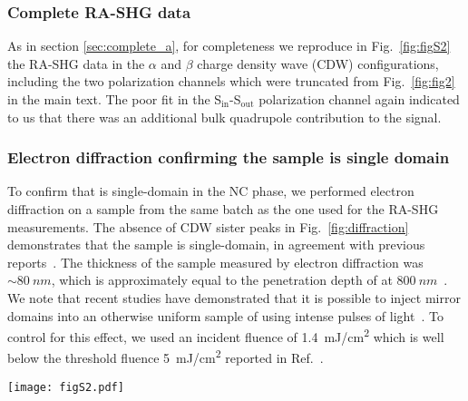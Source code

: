 \subsubsection{Complete RA-SHG data\label{sec:complete_b}}
As in section \ref{sec:complete_a}, for completeness we reproduce in Fig.~\ref{fig:figS2} the RA-SHG data in the $\alpha$ and $\beta$ charge density wave (CDW) configurations, including the two polarization channels which were truncated from Fig.~\ref{fig:fig2} in the main text.
The poor fit in the S$_\mathrm{in}$-S$_\mathrm{out}$ polarization channel again indicated to us that there was an additional bulk quadrupole contribution to the signal.

\subsubsection{Electron diffraction confirming the sample is single domain}
To confirm that \tastwo is single-domain in the NC phase, we performed electron diffraction on a sample from the same batch as the one used for the RA-SHG measurements.
The absence of CDW sister peaks in Fig.~\ref{fig:diffraction} demonstrates that the sample is single-domain, in agreement with previous reports~\cite{zong_ultrafast_2018, wilson_charge-density_1975, bovet_pseudogapped_2004, shiba_phenomenological_1986}.
The thickness of the sample measured by electron diffraction was $\sim\qty{80}{nm}$, which is approximately equal to the penetration depth of \tastwo at $\qty{800}{nm}$~\cite{mann_probing_2016}.
We note that recent studies have demonstrated that it is possible to inject mirror domains into an otherwise uniform sample of \tastwo using intense pulses of light~\cite{zong_ultrafast_2018}.
To control for this effect, we used an incident fluence of \qty{1.4}{mJ/cm^2} which is well below the threshold fluence \qty{5}{mJ/cm^2} reported in Ref.~.

\begin{figure*}
\texttt{[image: figS2.pdf]}
\caption{\label{fig:figS2}Second harmonic intensity as a function of $\phi$ from two samples of \tastwo in the NC phase ($T=340K$).
The labels $\alpha$ and $\beta$ refer to the two degenerate mirror-image configurations which can exist in the NC phase.
The solid line in (a) is a fit to the data using the surface point group $C_3$.
The fit in (b) was generated by performing a mirror operation (see section \ref{sec:mirrorflip}) to the numerical susceptibility tensor obtained from (a).
Data is normalized to the maximum value in the P$_\mathrm{in}$-P$_\mathrm{out}$ polarization channel for each sample.}
\end{figure*}


